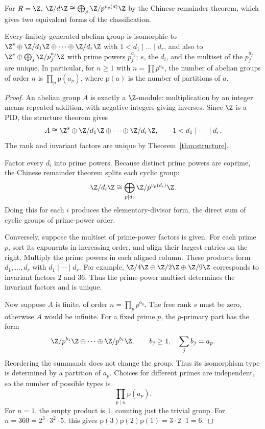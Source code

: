 For $R=\Z$, $\Z/d\Z\cong\bigoplus_p\Z/p^{v_p(d)}\Z$ by the Chinese remainder theorem, which gives two equivalent forms of the classification.

\begin{corollary}\label{cor:abelian}
Every finitely generated abelian group is isomorphic to $\Z^s\oplus\Z/d_1\Z\oplus\dots\oplus\Z/d_r\Z$ with $1<d_1\mid\dots\mid d_r$, and also to $\Z^s\oplus\bigoplus_j\Z/p_j^{a_j}\Z$ with prime powers $p_j^{a_j}$; $s$, the $d_i$, and the multiset of the $p_j^{a_j}$ are unique. In particular, for $n\ge1$ with $n=\prod p^{a_p}$, the number of abelian groups of order $n$ is $\prod_p\mathrm{p}(a_p)$, where $\mathrm p(a)$ is the number of partitions of $a$.
\end{corollary}
\begin{proof}
An abelian group $A$ is exactly a
$\Z$-module: multiplication by an
integer means repeated addition,
with negative integers giving inverses.
Since $\Z$ is a PID, the structure
theorem gives
\[
A\cong\Z^s\oplus
\Z/d_1\Z\oplus\cdots\oplus\Z/d_r\Z,
\qquad1<d_1\mid\cdots\mid d_r.
\]
The rank and invariant factors are
unique by Theorem~\ref{thm:structure}.

Factor every $d_i$ into prime powers.
Because distinct prime powers are
coprime, the Chinese remainder theorem
splits each cyclic group:
\[
\Z/d_i\Z\cong
\bigoplus_{p\mid d_i}\Z/p^{v_p(d_i)}\Z.
\]
Doing this for each $i$ produces the
elementary-divisor form, the direct sum
of cyclic groups of prime-power order.

Conversely, suppose the multiset of
prime-power factors is given.
For each prime $p$, sort its exponents
in increasing order, and align their
largest entries on the right.
Multiply the prime powers in each
aligned column. These products form
$d_1,\ldots,d_r$ with
$d_1\mid\cdots\mid d_r$.
For example, $\Z/4\Z\oplus\Z/2\Z
\oplus\Z/9\Z$ corresponds to
invariant factors $2$ and $36$.
Thus the prime-power multiset determines
the invariant factors and is unique.

Now suppose $A$ is finite, of order
$n=\prod_p p^{a_p}$. The free rank
$s$ must be zero, otherwise $A$
would be infinite. For a fixed prime
$p$, the $p$-primary part has the form
\[
\Z/p^{b_1}\Z\oplus\cdots\oplus
\Z/p^{b_t}\Z,\qquad
b_j\ge1,\quad\sum_jb_j=a_p.
\]
Reordering the summands does not change
the group. Thus its isomorphism type
is determined by a partition of $a_p$.
Choices for different primes are independent,
so the number of possible types is
\[
\boxed{\prod_{p\mid n}\mathrm p(a_p)}.
\]
For $n=1$, the empty product is $1$, counting just the trivial group.
For $n=360=2^3\cdot3^2\cdot5$,
this gives $\mathrm p(3)\mathrm p(2)
\mathrm p(1)=3\cdot2\cdot1=6$.
\end{proof}


